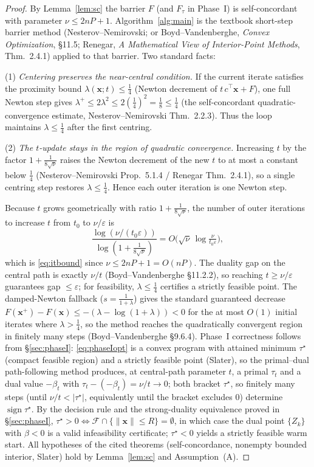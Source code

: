 \documentclass{amsart}
\begin{document}
\begin{proof}
By Lemma~\ref{lem:sc} the barrier $F$ (and $F_\tau$ in Phase~I) is self-concordant
with parameter $\nu\le2nP+1$. Algorithm~\ref{alg:main} is the textbook short-step
barrier method (Nesterov--Nemirovski; or Boyd--Vandenberghe, \emph{Convex
Optimization}, \S11.5; Renegar, \emph{A Mathematical View of Interior-Point
Methods}, Thm.~2.4.1) applied to that barrier. Two standard facts:

(1) \emph{Centering preserves the near-central condition.} If the current iterate
satisfies the proximity bound $\lambda(\bm x;t)\le\frac14$ (Newton decrement of
$t\,c^{\!\top}\bm x+F$), one full Newton step gives $\lambda^+\le2\lambda^2\le
2(\tfrac14)^2=\tfrac18\le\frac14$ (the self-concordant quadratic-convergence
estimate, Nesterov--Nemirovski Thm.~2.2.3). Thus the loop maintains
$\lambda\le\frac14$ after the first centring.

(2) \emph{The $t$-update stays in the region of quadratic convergence.}
Increasing $t$ by the factor $1+\frac{1}{8\sqrt\nu}$ raises the Newton decrement of
the new $t$ to at most a constant below $\frac14$ (Nesterov--Nemirovski Prop.~5.1.4
/ Renegar Thm.~2.4.1), so a single centring step restores $\lambda\le\frac14$. Hence
each outer iteration is one Newton step.

Because $t$ grows geometrically with ratio $1+\frac1{8\sqrt\nu}$, the number of outer
iterations to increase $t$ from $t_0$ to $\nu/\varepsilon$ is
\[
  \frac{\log(\nu/(t_0\varepsilon))}{\log(1+\tfrac1{8\sqrt\nu})}
  = O\!\big(\sqrt\nu\,\log\tfrac{\nu}{t_0\varepsilon}\big),
\]
which is \eqref{eq:itbound} since $\nu\le2nP+1=O(nP)$. The duality gap on the central path is
exactly $\nu/t$ (Boyd--Vandenberghe \S11.2.2), so reaching $t\ge\nu/\varepsilon$
guarantees gap $\le\varepsilon$; for feasibility, $\lambda\le\frac14$ certifies a
strictly feasible point. The damped-Newton fallback ($s=\frac1{1+\lambda}$) gives the
standard guaranteed decrease $F(\bm x^+)-F(\bm x)\le-(\lambda-\log(1+\lambda))<0$ for
the at most $O(1)$ initial iterates where $\lambda>\frac14$, so the method reaches the
quadratically convergent region in finitely many steps (Boyd--Vandenberghe \S9.6.4).
Phase~I correctness follows from \S\ref{sec:phaseI}: \eqref{eq:phaseIopt} is a convex
program with attained minimum $\tau^\star$ (compact feasible region) and a strictly
feasible point (Slater), so the primal--dual path-following method produces, at
central-path parameter $t$, a primal $\tau_t$ and a dual value $-\beta_t$ with
$\tau_t-(-\beta_t)=\nu/t\to0$; both bracket $\tau^\star$, so finitely many steps
(until $\nu/t<|\tau^\star|$, equivalently until the bracket excludes $0$) determine
$\operatorname{sign}\tau^\star$. By the decision rule and the strong-duality
equivalence proved in \S\ref{sec:phaseI}, $\tau^\star>0\Leftrightarrow\mathcal
F\cap\{\|\bm x\|\le R\}=\emptyset$, in which case the dual point $\{Z_k\}$ with
$\beta<0$ is a valid infeasibility certificate; $\tau^\star<0$ yields a strictly
feasible warm start. All hypotheses of the cited theorems (self-concordance, nonempty
bounded interior, Slater) hold by Lemma~\ref{lem:sc} and Assumption~(A).
\end{proof}
\end{document}
